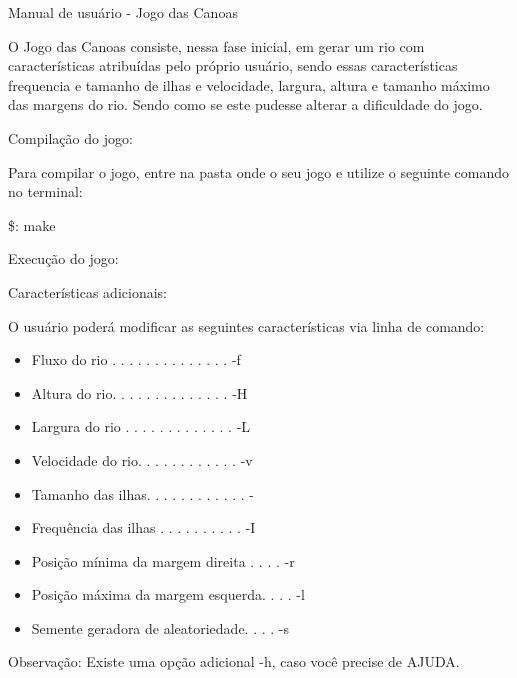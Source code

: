 \documentclass[a4paper,12pt]{article}
\begin{document}
 
\begin{center} 
	{\LARGE Manual de usuário - Jogo das Canoas}
\end{center}



\bigskip
\bigskip


O Jogo das Canoas consiste, nessa fase inicial, em gerar um rio com características atribuídas pelo próprio usuário, sendo essas características frequencia e tamanho de ilhas e velocidade, largura, altura e tamanho máximo das margens do rio.
Sendo como se este pudesse alterar a dificuldade do jogo.

 
 \newpage
\begin{center}
{\Large Compilação do jogo:}
\end{center}

Para compilar o jogo, entre na pasta onde o seu jogo e utilize o seguinte comando no terminal:

\$: make

\begin{center}
{\Large Execução do jogo:}
\end{center}

\begin{center}
 {\Large Características adicionais:}
\end{center}

{\large O usuário poderá modificar as seguintes características via linha de comando:}

\bigskip
\begin{itemize}
\item Fluxo do rio . . . . . . . . . . . . . .  -f
\item Altura do rio. . . . . . . . . . . . . .  -H 
\item Largura do rio . . . . . . . . . . . . .  -L
\item Velocidade do rio. . . . . . . . . . . .  -v	
\item Tamanho das ilhas. . . . . . . . . . . .  -
\item Frequência das ilhas . . . . . . . . . .  -I
\item Posição mínima da margem direita . . . .  -r 
\item Posição máxima da margem esquerda. . . .  -l
\item Semente geradora de aleatoriedade. . . .  -s
\end{itemize}

\bigskip

Observação: Existe uma opção adicional -h, caso você precise de AJUDA.
 
\end{document}
